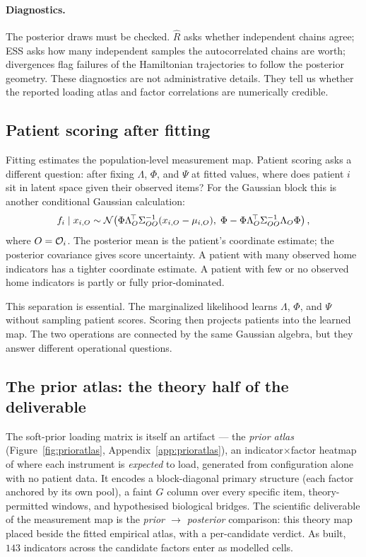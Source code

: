 \paragraph{Diagnostics.} The posterior draws must be checked. $\widehat R$ asks whether independent chains agree;
ESS asks how many independent samples the autocorrelated chains are worth; divergences flag failures of the
Hamiltonian trajectories to follow the posterior geometry. These diagnostics are not administrative details.
They tell us whether the reported loading atlas and factor correlations are numerically credible.

\subsection{Patient scoring after fitting}
\label{sub:scoring_bridge}
Fitting estimates the population-level measurement map. Patient scoring asks a different question: after fixing
$\Lambda$, $\Phi$, and $\Psi$ at fitted values, where does patient $i$ sit in latent space given their observed
items? For the Gaussian block this is another conditional Gaussian calculation:
\begin{equation}
\label{eq:score_mean}
f_i\mid x_{i,O}
\sim
\mathcal{N}\!\left(
\Phi\Lambda_O^{\!\top}\Sigma_{OO}^{-1}(x_{i,O}-\mu_{i,O}),
\;
\Phi-\Phi\Lambda_O^{\!\top}\Sigma_{OO}^{-1}\Lambda_O\Phi
\right),
\end{equation}
where $O=\mathcal{O}_i$. The posterior mean is the patient's coordinate estimate; the posterior covariance gives score
uncertainty. A patient with many observed home indicators has a tighter coordinate estimate. A patient with few
or no observed home indicators is partly or fully prior-dominated.

This separation is essential. The marginalized likelihood learns $\Lambda$, $\Phi$, and $\Psi$ without sampling
patient scores. Scoring then projects patients into the learned map. The two operations are connected by the
same Gaussian algebra, but they answer different operational questions.

\subsection{The prior atlas: the theory half of the deliverable}
\label{sub:prioratlas}
The soft-prior loading matrix is itself an artifact --- the \emph{prior atlas} (Figure~\ref{fig:prioratlas},
Appendix~\ref{app:prioratlas}), an indicator$\times$factor heatmap of where each instrument is \emph{expected}
to load, generated from configuration alone with no patient data. It encodes a block-diagonal primary structure
(each factor anchored by its own pool), a faint $G$ column over every specific item, theory-permitted windows,
and hypothesised biological bridges. The scientific deliverable of the measurement map is the \emph{prior $\to$
posterior} comparison: this theory map placed beside the fitted empirical atlas, with a per-candidate verdict.
As built, $143$ indicators across the candidate factors enter as modelled cells.

